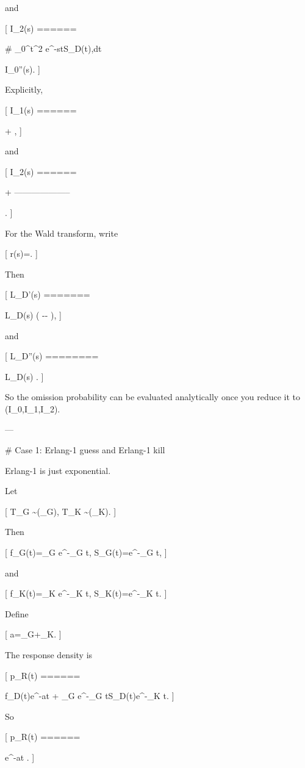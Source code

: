 and

[
I_2(s)
======

# \int_0^\infty t^2 e^{-st}S_D(t),dt

I_0''(s).
]

Explicitly,

[
I_1(s)
======

+
,
]

and

[
I_2(s)
======

+
--------------------

.
]

For the Wald transform, write

[
r(s)=.
]

Then

[
L_D'(s)
=======

L_D(s)
\left(
-\tau-
\right),
]

and

[
L_D''(s)
========

L_D(s)
.
]

So the omission probability can be evaluated analytically once you reduce it to (I_0,I_1,I_2).

---

# Case 1: Erlang-1 guess and Erlang-1 kill

Erlang-1 is just exponential.

Let

[
T_G \sim {}(\lambda_G),
\qquad
T_K \sim {}(\lambda_K).
]

Then

[
f_G(t)=\lambda_G e^{-\lambda_G t},
\qquad
S_G(t)=e^{-\lambda_G t},
]

and

[
f_K(t)=\lambda_K e^{-\lambda_K t},
\qquad
S_K(t)=e^{-\lambda_K t}.
]

Define

[
a=\lambda_G+\lambda_K.
]

The response density is

[
p_R(t)
======

f_D(t)e^{-at}
+
\lambda_G e^{-\lambda_G t}S_D(t)e^{-\lambda_K t}.
]

So

[
p_R(t)
======

e^{-at}
.
]


